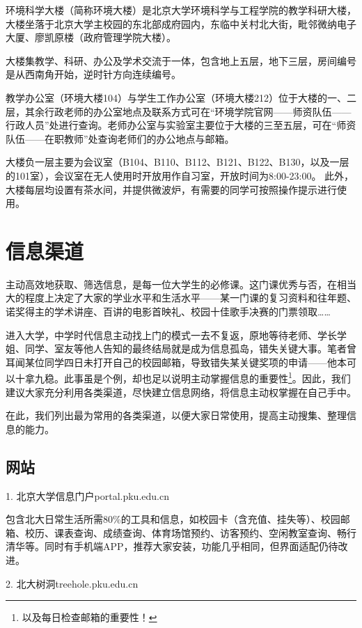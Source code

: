 \documentclass[11pt,oneside]{book}
\begin{document}
环境科学大楼（简称环境大楼）是北京大学环境科学与工程学院的教学科研大楼，大楼坐落于北京大学主校园的东北部成府园内，东临中关村北大街，毗邻微纳电子大厦、廖凯原楼（政府管理学院大楼）。

大楼集教学、科研、办公及学术交流于一体，包含地上五层，地下三层，房间编号是从西南角开始，逆时针方向连续编号。

教学办公室（环境大楼104）与学生工作办公室（环境大楼212）位于大楼的一、二层，其余行政老师的办公室地点及联系方式可在“环境学院官网——师资队伍——行政人员”处进行查询。老师办公室与实验室主要位于大楼的三至五层，可在“师资队伍——在职教师”处查询老师们的办公地点与邮箱。

大楼负一层主要为会议室（B104、B110、B112、B121、B122、B130，以及一层的101室），会议室在无人使用时开放用作自习室，开放时间为8:00-23:00。
此外，大楼每层均设置有茶水间，并提供微波炉，有需要的同学可按照操作提示进行使用。


\section{信息渠道}
主动高效地获取、筛选信息，是每一位大学生的必修课。这门课优秀与否，在相当大的程度上决定了大家的学业水平和生活水平——某一门课的复习资料和往年题、诺奖得主的学术讲座、百讲的电影首映礼、校园十佳歌手决赛的门票领取……

进入大学，中学时代信息主动找上门的模式一去不复返，原地等待老师、学长学姐、同学、室友等他人告知的最终结局就是成为信息孤岛，错失关键大事。笔者曾耳闻某位同学四日未打开自己的校园邮箱，导致错失某关键奖项的申请——他本可以十拿九稳。此事虽是个例，却也足以说明主动掌握信息的重要性\footnote{以及每日检查邮箱的重要性！}。因此，我们建议大家充分利用各类渠道，尽快建立信息网络，将信息主动权掌握在自己手中。

在此，我们列出最为常用的各类渠道，以便大家日常使用，提高主动搜集、整理信息的能力。

\subsection{网站}

1. 北京大学信息门户\quad portal.pku.edu.cn

包含北大日常生活所需80\%的工具和信息，如校园卡（含充值、挂失等）、校园邮箱、校历、课表查询、成绩查询、体育场馆预约、访客预约、空闲教室查询、畅行清华等。同时有手机端APP，推荐大家安装，功能几乎相同，但界面适配仍待改进。

\vspace{20pt}

2. 北大树洞\quad treehole.pku.edu.cn
\end{document}
